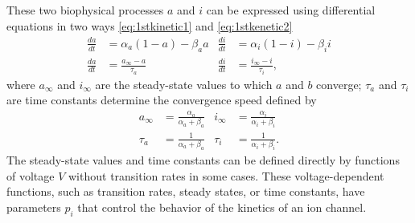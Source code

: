 \documentclass[11pt]{article}
\begin{document}
These two biophysical processes $a$ and $i$ can be expressed using differential equations in two ways \eqref{eq:1stkinetic1} and \eqref{eq:1stkenetic2}
\begin{align}
    \label{eq:1stkinetic1}
    \frac{da}{dt} &=\alpha_{a}(1-a)-\beta_{a}a   &\frac{di}{dt} &=\alpha_{i}(1-i)-\beta_{i}i \\
    \label{eq:1stkenetic2}
    \frac{da}{dt} &= \frac{a_{\infty}-a}{\tau_{a}}  &\frac{di}{dt} &= \frac{i_{\infty}-i}{\tau_{i}},
\end{align}
where $a_{\infty}$ and $i_{\infty}$ are the steady-state values to which $a$ and $b$ converge; $\tau_{a}$ and $\tau_{i}$ are time constants determine the convergence speed defined by
\begin{align}
    a_{\infty} &= \frac{\alpha_{a}}{\alpha_{a}+\beta_{a}} & i_{\infty} &=  \frac{\alpha_{i}}{\alpha_{i}+\beta_{i}} \\
    \tau_{a} &= \frac{1}{\alpha_{a}+\beta_{a}} & \tau_{i} &= \frac{1}{\alpha_{i}+\beta_{i}}.
\end{align}
The steady-state values and time constants can be defined directly by functions of voltage $V$ without transition rates in some cases. These voltage-dependent functions, such as transition rates, steady states, or time constants, have parameters $p_{i}$ that control the behavior of the kinetics of an ion channel.
\end{document}
